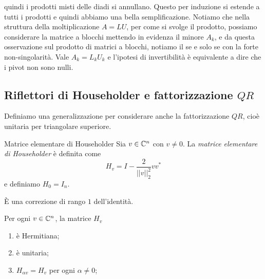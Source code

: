 \documentclass[a4paper]{article}
\begin{document}
quindi i prodotti misti delle diadi si annullano.
Questo per induzione si estende a tutti i prodotti e quindi abbiamo una bella semplificazione.
Notiamo che nella struttura della moltiplicazione \(A=LU\),
per come si svolge il prodotto, possiamo considerare la matrice a blocchi
mettendo in evidenza il minore \(A_k\),
e da questa osservazione sul prodotto di matrici a blocchi,
notiamo il se e solo se con la forte non-singolarità. Vale \(A_k = L_k U_k\)
e l'ipotesi di invertibilità è equivalente a dire che i pivot non sono nulli.

\subsection{Riflettori di Householder e fattorizzazione \(QR\)}

Definiamo una generalizzazione per considerare anche la fattorizzazione \(QR\),
cioè unitaria per triangolare superiore.

\begin{snippetdefinition}{Matrice elementare di Householder}
    Sia \(v \in \mathbb{C}^n\) con \(v \neq 0\).
    La \emph{matrice elementare di Householder} è definita come
    \[
        H_v = I - \frac{2}{||v||_2^2} vv^*
    \]
    e definiamo \(H_0 = I_n\).
\end{snippetdefinition}

È una correzione di rango \(1\) dell'identità.

\begin{snippetproposition}{}
    Per ogni \(v \in \mathbb{C}^n\),
    la matrice \(H_v\)
    \begin{enumerate}
        \item è Hermitiana;
        \item è unitaria;
        \item \(H_{\alpha v} = H_v\) per ogni \(\alpha \neq 0\);
    \end{enumerate}
\end{snippetproposition}
\end{document}
